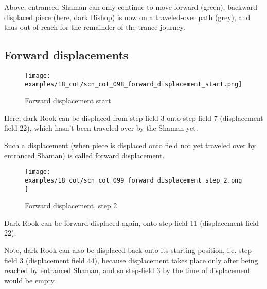 Above, entranced Shaman can only continue to move forward (green), backward
displaced piece (here, dark Bishop) is now on a traveled-over path (grey),
and thus out of reach for the remainder of the trance-journey.

\clearpage %

\subsection*{Forward displacements}
\label{sec:Conquest of Tlalocan/Trance-journey/Forward displacements}

\vspace*{-1.0\baselineskip}
\noindent
\begin{figure}[!h]
\texttt{[image: examples/18\_cot/scn\_cot\_098\_forward\_displacement\_start.png]}
\caption{Forward displacement start}
\label{fig:scn_cot_098_forward_displacement_start}
\end{figure}

Here, dark Rook can be displaced from step-field 3 onto step-field 7 (displacement
field 22), which hasn't been traveled over by the Shaman yet.

Such a displacement (when piece is displaced onto field not yet traveled over by
entranced Shaman) is called forward displacement.

\clearpage %

\noindent
\begin{figure}[!h]
\texttt{[image: examples/18\_cot/scn\_cot\_099\_forward\_displacement\_step\_2.png]}
\caption{Forward displacement, step 2}
\label{fig:scn_cot_099_forward_displacement_step_2}
\end{figure}

Dark Rook can be forward-displaced again, onto step-field 11 (displacement field 22).

Note, dark Rook can also be displaced back onto its starting position, i.e. step-field
3 (displacement field 44), because displacement takes place only after being reached
by entranced Shaman, and so step-field 3 by the time of displacement would be empty.

\clearpage %

